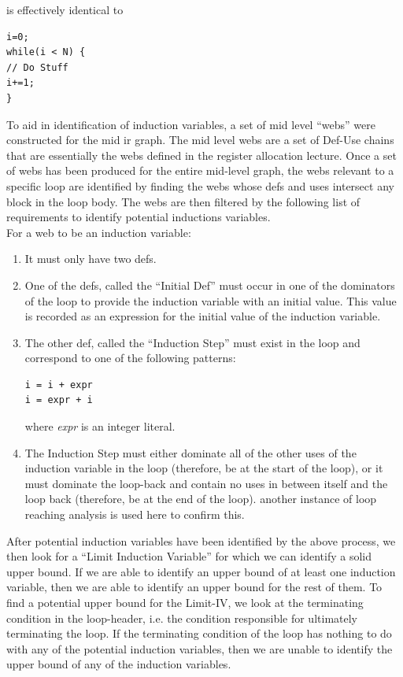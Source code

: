 \documentclass[11pt]{article}
\begin{document}
\noindent is effectively identical to 

\begin{verbatim} 
i=0; 
while(i < N) { 
// Do Stuff 
i+=1;
}
\end{verbatim} 

\noindent To aid in identification of induction variables, a set of
mid level ``webs'' were constructed for the mid ir graph. The mid
level webs are a set of Def-Use chains that are essentially the webs
defined in the register allocation lecture. Once a set of webs has
been produced for the entire mid-level graph, the webs relevant to a
specific loop are identified by finding the webs whose defs and uses
intersect any block in the loop body. The webs are then filtered by
the following list of requirements to identify potential inductions
variables.\\ 

\noindent For a web to be an induction variable: 

\begin{enumerate} 

\item It must only have two defs. 

\item One of the defs, called the ``Initial Def'' must occur in one of the
  dominators of the loop to provide the induction variable with an
  initial value. This value is recorded as an expression for the
  initial value of the induction variable. 

\item The other def, called the ``Induction Step'' must exist in the
  loop and correspond to one of the following patterns: 
\begin{verbatim}
i = i + expr 
i = expr + i
\end{verbatim}
where \emph{expr} is an integer literal. 

\item The Induction Step must either dominate all of the other uses of
  the induction variable in the loop (therefore, be at the start of
  the loop), or it must dominate the loop-back and contain no uses in
  between itself and the loop back (therefore, be at the end of the
  loop). another instance of loop reaching analysis is used here to
  confirm this. 

\end{enumerate} 

After potential induction variables have been identified by the above
process, we then look for a ``Limit Induction Variable'' for which we
can identify a solid upper bound. If we are able to identify an upper
bound of at least one induction variable, then we are able to identify
an upper bound for the rest of them. To find a potential upper bound
for the Limit-IV, we look at the terminating condition in the
loop-header, i.e. the condition responsible for ultimately terminating
the loop. If the terminating condition of the loop has nothing to do
with any of the potential induction variables, then we are unable to
identify the upper bound of any of the induction variables. 
\end{document}
